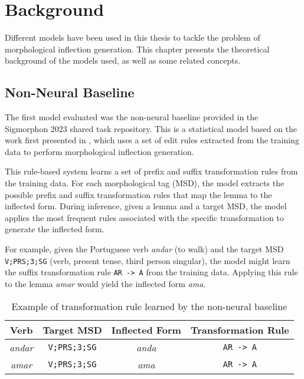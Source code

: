 \chapter{Background}\label{chapter:background}

Different models have been used in this thesis to tackle the problem of morphological inflection generation. This chapter presents the theoretical background of the models used, as well as some related concepts.

\section{Non-Neural Baseline}

The first model evaluated was the non-neural baseline provided in the Sigmorphon 2023 shared task \cite{goldman-etal-2023-sigmorphon} repository.
This is a statistical model based on the work first presented in \cite{cotterell2017conllsigmorphon2017sharedtask}, which uses a set of edit rules extracted from the training data to perform morphological inflection generation.

This rule-based system learns a set of prefix and suffix transformation rules from the training data. For each morphological tag (MSD), the model extracts the possible prefix and suffix transformation rules that map the lemma to the inflected form. During inference, given a lemma and a target MSD, the model applies the most frequent rules associated with the specific transformation to generate the inflected form.

For example, given the Portuguese verb \textit{andar} (to walk) and the target MSD \texttt{V;PRS;3;SG} (verb, present tense, third person singular), the model might learn the suffix transformation rule \texttt{AR -> A} from the training data. Applying this rule to the lemma \textit{amar} would yield the inflected form \textit{ama}.

\begin{table}[h]
    \centering
    \begin{tabular}{|c|c|c|c|}
        \hline
        Verb & Target MSD & Inflected Form & Transformation Rule \\
        \hline
        \textit{andar} & \texttt{V;PRS;3;SG} & \textit{anda} & \texttt{AR -> A} \\
        \hline
        \textit{amar} & \texttt{V;PRS;3;SG} & \textit{ama} & \texttt{AR -> A} \\
        \hline
    \end{tabular}
    \caption{Example of transformation rule learned by the non-neural baseline}
\end{table}

